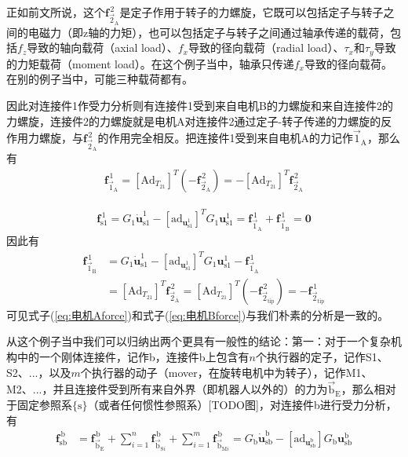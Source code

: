 \documentclass[12pt, a4paper, article, UTF8]{ctexart}
\begin{document}
正如前文所说，这个$\mathbf{f}_{\vec{2}_{\text{A}}}^{\,2}$是定子作用于转子的力螺旋，它既可以包括定子与转子之间的电磁力（即z轴的力矩），也可以包括定子与转子之间通过轴承传递的载荷，包括$f_z$导致的轴向载荷（axial load）、$f_x$导致的径向载荷（radial load）、$\tau_x$和$\tau_y$导致的力矩载荷（moment load）。在这个例子当中，轴承只传递$f_x$导致的径向载荷。在别的例子当中，可能三种载荷都有。

因此对连接件1作受力分析则有连接件1受到来自电机B的力螺旋和来自连接件2的力螺旋，连接件2的力螺旋就是电机A对连接件2通过定子-转子传递的力螺旋的反作用力螺旋，与$\mathbf{f}_{\vec{2}_{\text{A}}}^{\,2}$的作用完全相反。把连接件1受到来自电机A的力记作$\vec{1}_\text{A}$，那么有
\begin{align}
\mathbf{f}_{\vec{1}_{\text{A}}}^{\,1} =[\text{Ad}_{T_{21}}]^T (-\mathbf{f}_{\vec{2}_{\text{A}}}^{\,2}) = -[\text{Ad}_{T_{21}}]^T \mathbf{f}_{\vec{2}_{\text{A}}}^{\,2}
\end{align}

\begin{align}
\mathbf{f}_{\text{s}1}^{\,1} =  {G}_1 \dot{\mathbf{u}}_{\text{s}1}^{1} - [\text{ad}_{\mathbf{u}_{\text{s}1}^{1}}]^T G_1\mathbf{u}_{\text{s}1}^{1} = \mathbf{f}_{\vec{1}_{\text{A}}}^{\,1} + \mathbf{f}_{\vec{1}_{\text{B}}}^{\,1} =\mathbf{0}
\end{align}
因此有
\begin{align}
\mathbf{f}_{\vec{1}_{\text{B}}}^{\,1} &= {G}_1 \dot{\mathbf{u}}_{\text{s}1}^{1} - [\text{ad}_{\mathbf{u}_{\text{s}1}^{1}}]^T G_1\mathbf{u}_{\text{s}1}^{1} - \mathbf{f}_{\vec{1}_{\text{A}}}^{\,1} \nonumber \\
&= [\text{Ad}_{T_{21}}]^T \mathbf{f}_{\vec{2}_{\text{A}}}^{\,2} = [\text{Ad}_{T_{21}}]^T( - \mathbf{f}^{\, 2}_{\vec{2}_{\text{tip}}}) =- \mathbf{f}^{\, 1}_{\vec{2}_{\text{tip}}}  \label{eq:电机Bforce}
\end{align}
可见式子(\ref{eq:电机Aforce})和式子(\ref{eq:电机Bforce})与我们朴素的分析是一致的。






从这个例子当中我们可以归纳出两个更具有一般性的结论：第一：对于一个复杂机构中的一个刚体连接件，记作b，连接件b上包含有$n$个执行器的定子，记作S1、S2、...，以及$m$个执行器的动子（mover，在旋转电机中为转子），记作M1、M2、...，并且连接件受到所有来自外界（即机器人以外的）的力为$\vec{\text{b}}_\text{E}$，那么相对于固定参照系$\{\text{s}\}$（或者任何惯性参照系）[TODO图]，对连接件b进行受力分析，有
\begin{align}
\mathbf{f}_{\text{sb}}^{\,\text{b}} &= \mathbf{f}^{\,\text{b}}_{\vec{\text{b}}_{\text{E}}} +  \sum^{n}_{i=1} \mathbf{f}^{\,\text{b}}_{\vec{\text{b}}_{\text{S}i}} + \sum^{m}_{i=1} \mathbf{f}^{\,\text{b}}_{\vec{\text{b}}_{\text{M}i}}   = G_{\text{b}} \dot{\mathbf{u}}_{\text{sb}}^{\text{b}} - [\text{ad}_{\mathbf{u}_{\text{sb}}^{\text{b}}}] G_{\text{b}}\mathbf{u}_{\text{sb}}^{\text{b}} 
\label{eq:连接件dynamics}
\end{align}
\end{document}
